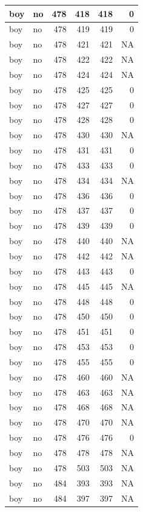 \documentclass[man]{apa6}
\begin{document}
\begin{tabular}{l|l|r|r|r|r}
\hline
boy & no & 478 & 418 & 418 & 0\\
\hline
boy & no & 478 & 419 & 419 & 0\\
\hline
boy & no & 478 & 421 & 421 & NA\\
\hline
boy & no & 478 & 422 & 422 & NA\\
\hline
boy & no & 478 & 424 & 424 & NA\\
\hline
boy & no & 478 & 425 & 425 & 0\\
\hline
boy & no & 478 & 427 & 427 & 0\\
\hline
boy & no & 478 & 428 & 428 & 0\\
\hline
boy & no & 478 & 430 & 430 & NA\\
\hline
boy & no & 478 & 431 & 431 & 0\\
\hline
boy & no & 478 & 433 & 433 & 0\\
\hline
boy & no & 478 & 434 & 434 & NA\\
\hline
boy & no & 478 & 436 & 436 & 0\\
\hline
boy & no & 478 & 437 & 437 & 0\\
\hline
boy & no & 478 & 439 & 439 & 0\\
\hline
boy & no & 478 & 440 & 440 & NA\\
\hline
boy & no & 478 & 442 & 442 & NA\\
\hline
boy & no & 478 & 443 & 443 & 0\\
\hline
boy & no & 478 & 445 & 445 & NA\\
\hline
boy & no & 478 & 448 & 448 & 0\\
\hline
boy & no & 478 & 450 & 450 & 0\\
\hline
boy & no & 478 & 451 & 451 & 0\\
\hline
boy & no & 478 & 453 & 453 & 0\\
\hline
boy & no & 478 & 455 & 455 & 0\\
\hline
boy & no & 478 & 460 & 460 & NA\\
\hline
boy & no & 478 & 463 & 463 & NA\\
\hline
boy & no & 478 & 468 & 468 & NA\\
\hline
boy & no & 478 & 470 & 470 & NA\\
\hline
boy & no & 478 & 476 & 476 & 0\\
\hline
boy & no & 478 & 478 & 478 & NA\\
\hline
boy & no & 478 & 503 & 503 & NA\\
\hline
boy & no & 484 & 393 & 393 & NA\\
\hline
boy & no & 484 & 397 & 397 & NA\\

\end{tabular}
\end{document}
